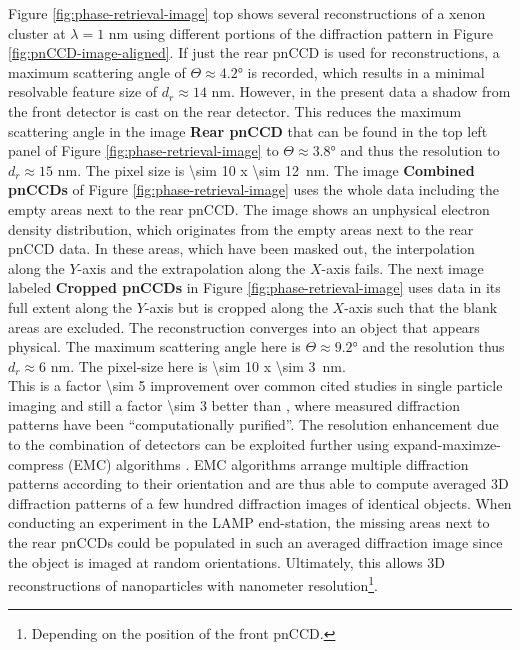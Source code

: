 Figure \ref{fig:phase-retrieval-image} top shows several reconstructions of a xenon cluster at $\lambda = 1$ nm using different portions of the diffraction pattern in Figure \ref{fig:pnCCD-image-aligned}. If just the rear pnCCD is used for reconstructions, a maximum scattering angle of $\Theta\approx 4.2$° is recorded, which results in a minimal resolvable feature size of $d_{r}\approx 14$ nm. However, in the present data a shadow from the front detector is cast on the rear detector. This reduces the maximum scattering angle in the image \textbf{Rear pnCCD} that can be found in the top left panel of Figure \ref{fig:phase-retrieval-image} to $\Theta\approx 3.8$° and thus the resolution to $d_{r}\approx 15$ nm. The pixel size is \SI{\sim 10 x \sim 12}{\nano\meter}. The image \textbf{Combined pnCCDs} of Figure \ref{fig:phase-retrieval-image} uses the whole data including the empty areas next to the rear pnCCD. The image shows an unphysical electron density distribution, which originates from the empty areas next to the rear pnCCD data. In these areas, which have been masked out, the interpolation along the $Y$-axis and the extrapolation along the $X$-axis fails. The next image labeled \textbf{Cropped pnCCDs} in Figure \ref{fig:phase-retrieval-image} uses data in its full extent along the $Y$-axis but is cropped along the $X$-axis such that the blank areas are excluded. The reconstruction converges into an object that appears physical. The maximum scattering angle here is $\Theta \approx 9.2$° and the resolution thus $d_{r}\approx 6$ nm. The pixel-size here is \SI{\sim 10 x \sim 3}{\nano\meter}.\\[1\baselineskip]
%
This is a factor \num{\sim 5} improvement over common cited studies in single particle imaging \citep{Seibert-2011-Nature} and still a factor \num{\sim 3} better than \citep{Hantke-2014-NatPho}, where measured diffraction patterns have been ``computationally purified''. The resolution enhancement due to the combination of detectors can be exploited further using expand-maximze-compress (EMC) algorithms \citep{Loh-2009-PRE}. EMC algorithms arrange multiple diffraction patterns according to their orientation and are thus able to compute averaged 3D diffraction patterns of a few hundred diffraction images of identical objects. When conducting an experiment in the LAMP end-station, the missing areas next to the rear pnCCDs could be populated in such an averaged diffraction image since the object is imaged at random orientations. Ultimately, this allows 3D reconstructions of nanoparticles with nanometer resolution\footnote{Depending on the position of the front pnCCD.}.\\
%
%
%
